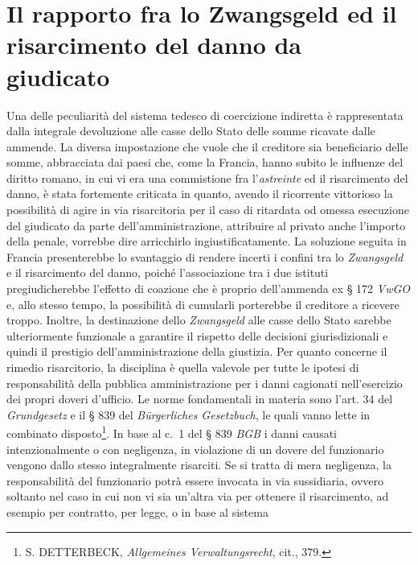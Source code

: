 \documentclass[12pt,it,a4paper,]{report}
\begin{document}
\hypertarget{il-rapporto-fra-lo-zwangsgeld-ed-il-risarcimento-del-danno-da-giudicato}{%
\section{Il rapporto fra lo Zwangsgeld ed il risarcimento del danno da
giudicato}\label{il-rapporto-fra-lo-zwangsgeld-ed-il-risarcimento-del-danno-da-giudicato}}

Una delle peculiarità del sistema tedesco di coercizione indiretta è
rappresentata dalla integrale devoluzione alle casse dello Stato delle
somme ricavate dalle ammende. La diversa impostazione che vuole che il
creditore sia beneficiario delle somme, abbracciata dai paesi che, come
la Francia, hanno subito le influenze del diritto romano, in cui vi era
una commistione fra l'\emph{astreinte} ed il risarcimento del danno, è
stata fortemente criticata in quanto, avendo il ricorrente vittorioso la
possibilità di agire in via risarcitoria per il caso di ritardata od
omessa esecuzione del giudicato da parte dell'amministrazione,
attribuire al privato anche l'importo della penale, vorrebbe dire
arricchirlo ingiustificatamente. La soluzione seguita in Francia
presenterebbe lo svantaggio di rendere incerti i confini tra lo
\emph{Zwangsgeld} e il risarcimento del danno, poiché l'associazione tra
i due istituti pregiudicherebbe l'effetto di coazione che è proprio
dell'ammenda ex § 172 \emph{VwGO} e, allo stesso tempo, la possibilità
di cumularli porterebbe il creditore a ricevere troppo. Inoltre, la
destinazione dello \emph{Zwangsgeld} alle casse dello Stato sarebbe
ulteriormente funzionale a garantire il rispetto delle decisioni
giurisdizionali e quindi il prestigio dell'amministrazione della
giustizia. Per quanto concerne il rimedio risarcitorio, la disciplina è
quella valevole per tutte le ipotesi di responsabilità della pubblica
amministrazione per i danni cagionati nell'esercizio dei propri doveri
d'ufficio. Le norme fondamentali in materia sono l'art. 34 del
\emph{Grundgesetz} e il § 839 del \emph{Bürgerliches Gesetzbuch}, le
quali vanno lette in combinato disposto\footnote{S. DETTERBECK,
  \emph{Allgemeines Verwaltungsrecht}, cit., 379.}. In base al c.~1 del
§ 839 \emph{BGB} i danni causati intenzionalmente o con negligenza, in
violazione di un dovere del funzionario vengono dallo stesso
integralmente risarciti. Se si tratta di mera negligenza, la
responsabilità del funzionario potrà essere invocata in via sussidiaria,
ovvero soltanto nel caso in cui non vi sia un'altra via per ottenere il
risarcimento, ad esempio per contratto, per legge, o in base al sistema
\end{document}
